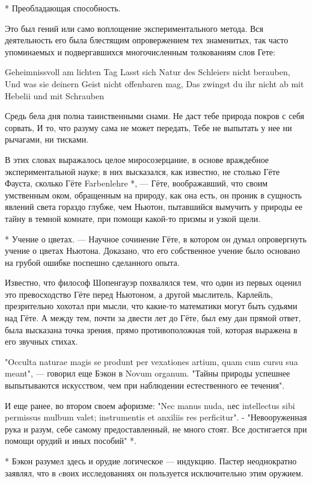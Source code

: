 * Преобладающая способность.

Это  был  гений  или  само  воплощение  экспериментального  метода.  Вся
деятельность его была блестящим опровержением тех знаменитых, так  часто
упоминаемых и подвергавшихся многочисленным толкованиям слов Гете:


Geheimnissvoll am lichten Tag
Lasst sich Natur des Schleiers nicht berauben,
Und was sie deinern Geist nicht offenbaren mag,
Das zwingst du ihr nicht ab mit Hebelii und mit Schrauben

Средь бела дня полна таинственными снами.
Не даст тебе природа покров с себя сорвать,
И то, что разуму сама не может передать,
Тебе не выпытать у нее ни рычагами, ни тисками.

В этих  словах  выражалось  целое миросозерцание,  в  основе  враждебное
экспериментальной науке; в них высказался, как известно, не столько Гёте
Фауста, сколько  Гёте Farbenlehre  *, ---  Гёте, воображавший,  что  своим
умственным оком,  обращенным  на природу,  как  она есть,  он  проник  в
сущность явлений света гораздо глубже, чем Ньютон, пытавшийся вымучить у
природы ее тайну в  темной комнате, при помощи  какой-то призмы и  узкой
щели.

* Учение о цветах. --- Научное сочинение Гёте, в котором он думал
опровергнуть учение о цветах Ньютона. Доказано, что его собственное
учение было основано на грубой ошибке поспешно сделанного опыта.

Известно, что  философ Шопенгауэр  похвалялся тем,  что один  из  первых
оценил это  превосходство  Гёте  перед  Ньютоном,  а  другой  мыслитель,
Карлейль, презрительно хохотал при мысли, что какие-то математики  могут
быть судьями над Гёте. А между тем, почти за двести лет до Гёте, был ему
дан прямой  ответ, была  высказана точка  зрения, прямо  противоположная
той, которая выражена в его звучных стихах.

"Occulta naturae magis se produnt per vexationes artium, quam cum  cursu
sua meant", --- говорил еще Бэкон в Novum organum. "Тайны природы успешнее
выпытываются искусством, чем при наблюдении естественного ее течения".

И еще ранее, во втором своем афоризме: "Nec manus nuda, nес  intellectus
sibi permissus mulbum valet; instrumentis et anxiliis res perficitur". -
"Невооруженная рука  и  разум,  себе самому  предоставленный,  не  много
стоят. Все достигается при помощи орудий и иных пособий" *.

* Бэкон разумел здесь и орудие логическое --- индукцию. Пастер
неоднократно заявлял, что в cвоих исследованиях он пользуется
исключительно этим оружием.

